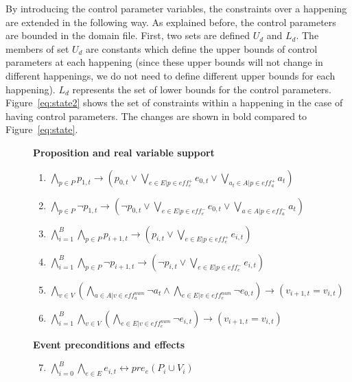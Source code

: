 By introducing the control parameter variables, the constraints over a happening are extended in the following way. As explained before, the control parameters are bounded in the domain file. First, two sets are defined $U_d$ and $L_d$. The members of set $U_d$ are constants which define the upper bounds of control parameters at each happening (since these upper bounds will not change in different happenings, we do not need to define different upper bounds for each happening). $L_d$ represents the set of lower bounds for the control parameters. Figure~\ref{eq:state2} shows the set of constraints within a happening in the case of having control parameters. The changes are shown in bold compared to Figure~\ref{eq:state}.

\begin{figure}[thb!]
\textbf{Proposition and real variable support}
\begin{enumerate}[label=H\arabic*.]
  \item $\bigwedge_{p \in P} p_{1,t} \rightarrow (p_{0,t} \vee \bigvee_{e \in E | p \in eff^{+}_{e}} e_{0,t} \vee \bigvee_{a_t \in A | p \in eff^{+}_{a}} a_t)$
  \item $\bigwedge_{p \in P} \neg p_{1,t} \rightarrow (\neg p_{0,t} \vee \bigvee_{e \in E | p \in eff^{-}_{e}} e_{0,t} \vee \bigvee_{a \in A | p \in eff^{-}_{a}} a_t)$
  \item $\bigwedge_{i=1}^{B} \bigwedge_{p \in P} p_{i+1,t}      \rightarrow (     p_{i,t} \vee \bigvee_{e \in E | p \in eff^{+}_{e}} e_{i,t})$
  \item $\bigwedge_{i=1}^{B} \bigwedge_{p \in P} \neg p_{i+1,t} \rightarrow (\neg p_{i,t} \vee \bigvee_{e \in E | p \in eff^{-}_{e}} e_{i,t})$
  \item $\bigwedge_{v \in V} (\bigwedge_{a \in A | v \in eff^{num}_{a}} \neg a_{t} \wedge \bigwedge_{e \in E | v \in eff^{num}_{e}} \neg e_{0,t}) \rightarrow (v_{i+1,t} = v_{i,t})$
  \item $\bigwedge_{i=1}^{B} \bigwedge_{v \in V} (\bigwedge_{e \in E | v \in eff^{num}_{e}} \neg e_{i,t}) \rightarrow (v_{i+1,t} = v_{i,t})$
\end{enumerate}
\textbf{Event preconditions and effects}
\begin{enumerate}[label=H\arabic*.]\setcounter{enumi}{6}
 \item $\bigwedge_{i=0}^{B} \bigwedge_{e \in E} e_{i,t} \leftrightarrow pre_{e} (P_{i} \cup V_{i})$

\end{enumerate}
\end{figure}
